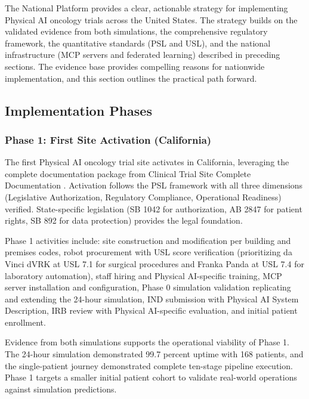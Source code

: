 
The National Platform provides a clear, actionable strategy for implementing
Physical AI oncology trials across the United States. The strategy builds on the
validated evidence from both simulations, the comprehensive regulatory
framework, the quantitative standards (PSL and USL), and the national
infrastructure (MCP servers and federated learning) described in preceding
sections. The evidence base provides compelling reasons for nationwide
implementation, and this section outlines the practical path forward.

\subsection{Implementation Phases}
\label{subsec:impl-phases}

\subsubsection{Phase 1: First Site Activation (California)}

The first Physical AI oncology trial site activates in California, leveraging
the complete documentation package from Clinical Trial Site Complete
Documentation \cite{site-docs}. Activation follows the PSL framework with all
three dimensions (Legislative Authorization, Regulatory Compliance, Operational
Readiness) verified. State-specific legislation (SB 1042 for authorization,
AB 2847 for patient rights, SB 892 for data protection) provides the legal
foundation.

Phase 1 activities include: site construction and modification per building and
premises codes, robot procurement with USL score verification (prioritizing
da Vinci dVRK at USL 7.1 for surgical procedures and Franka Panda at USL 7.4
for laboratory automation), staff hiring and Physical AI-specific training,
MCP server installation and configuration, Phase 0 simulation validation
replicating and extending the 24-hour simulation, IND submission with Physical
AI System Description, IRB review with Physical AI-specific evaluation,
and initial patient enrollment.

Evidence from both simulations \cite{patient-journey-paper, site-docs}
supports the operational viability of Phase 1. The 24-hour simulation
demonstrated 99.7 percent uptime with 168 patients, and the single-patient
journey demonstrated complete ten-stage pipeline execution. Phase 1 targets a
smaller initial patient cohort to validate real-world operations against
simulation predictions.


